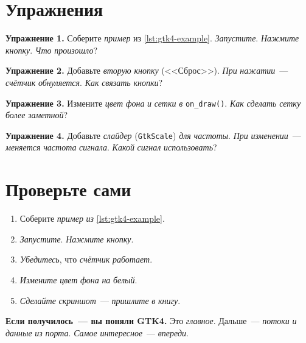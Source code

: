 \section{Упражнения}
\label{sec:gtk4-exercises}

\begin{exercisebox}
\textbf{Упражнение 1.} Соберите \emph{пример} из
\cref{lst:gtk4-example}. \emph{Запустите}. \emph{Нажмите}
\emph{кнопку}. \emph{Что} \emph{произошло}?
\end{exercisebox}

\begin{exercisebox}
\textbf{Упражнение 2.} Добавьте \emph{вторую} \emph{кнопку}
(<<Сброс>>). \emph{При} \emph{нажатии}~--- \emph{счётчик}
\emph{обнуляется}. \emph{Как} \emph{связать} \emph{кнопки}?
\end{exercisebox}

\begin{exercisebox}
\textbf{Упражнение 3.} Измените \emph{цвет} \emph{фона}
\emph{и} \emph{сетки} \emph{в} \texttt{on\_draw()}.
\emph{Как} \emph{сделать} \emph{сетку} \emph{более}
\emph{заметной}?
\end{exercisebox}

\begin{exercisebox}
\textbf{Упражнение 4.} Добавьте \emph{слайдер}
(\texttt{GtkScale}) \emph{для} \emph{частоты}. \emph{При}
\emph{изменении}~--- \emph{меняется} \emph{частота}
\emph{сигнала}. \emph{Какой} \emph{сигнал} \emph{использовать}?
\end{exercisebox}

\section{Проверьте сами}
\label{sec:gtk4-check}

\begin{enumerate}
    \item Соберите \emph{пример} \emph{из}
          \cref{lst:gtk4-example}.
    \item \emph{Запустите}. \emph{Нажмите} \emph{кнопку}.
    \item \emph{Убедитесь}, что \emph{счётчик} \emph{работает}.
    \item \emph{Измените} \emph{цвет} \emph{фона} \emph{на} \emph{белый}.
    \item \emph{Сделайте} \emph{скриншот}~--- \emph{пришлите}
          \emph{в} \emph{книгу}.
\end{enumerate}

\begin{ideabox}
\textbf{Если получилось~--- вы поняли GTK4.} Это
\emph{главное}. Дальше~--- \emph{потоки} \emph{и} \emph{данные}
\emph{из} \emph{порта}. \emph{Самое} \emph{интересное}~---
\emph{впереди}.
\end{ideabox}


